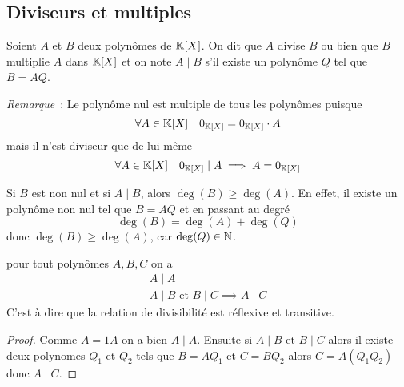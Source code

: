 \subsection{Diviseurs et multiples}

\begin{defdef}
  Soient \(A\) et \(B\) deux polynômes de \(\mathbb{K}[X]\). On dit que \(A\) divise \(B\) ou bien que \(B\) multiplie \(A\) dans \(\mathbb{K}[X]\) et on note \(A\mid{}B\) s'il existe un polynôme \(Q\) tel que \(B=AQ\).
\end{defdef}

\emph{Remarque}~: Le polynôme nul est multiple de tous les polynômes puisque
\begin{equation}
  \forall A \in \mathbb{K}[X] \quad 0_{\mathbb{K}[X]} = 0_{\mathbb{K}[X]} \cdot A
\end{equation}
mais il n'est diviseur que de lui-même
\begin{equation}
  \forall A \in \mathbb{K}[X] \quad 0_{\mathbb{K}[X]}\mid{}A \implies A=0_{\mathbb{K}[X]}
\end{equation}

Si \(B\) est non nul et si \(A\mid{}B\), alors \(\deg(B) \geqslant \deg(A)\). En effet, il existe un polynôme non nul tel que \(B=AQ\) et en passant au degré
\begin{equation}
  \deg(B) = \deg(A)+\deg(Q)
\end{equation}
donc \(\deg(B) \geqslant \deg(A)\), car \(\deg(Q)\in \mathbb{N}\).

\begin{prop}
  pour tout polynômes \(A,B,C\) on a
  \begin{align}
    A\mid{}A \\
    A\mid{}B \text{~et~} B\mid{}C \implies A\mid{}C
  \end{align}
  C'est à dire que la relation de divisibilité est réflexive et transitive.
\end{prop}
\begin{proof}
  Comme \(A=1 A\) on a bien \(A\mid{}A\). Ensuite si \(A\mid{}B \text{~et~} B\mid{}C\) alors il existe deux polynomes \(Q_1\) et \(Q_2\) tels que \(B=AQ_1\) et \(C=BQ_2\) alors \(C=A(Q_1Q_2)\) donc \(A\mid{}C\).
\end{proof}

